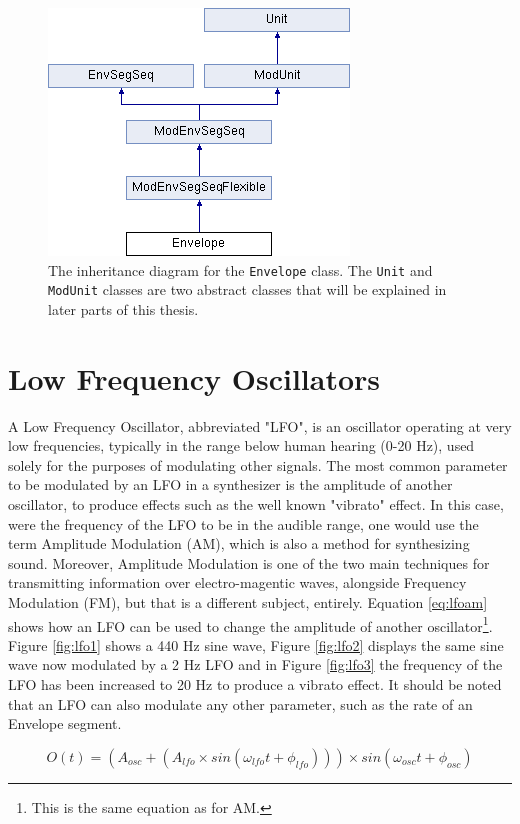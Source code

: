 \documentclass[12pt,twoside]{report}
\begin{document}
\begin{figure}
  \includegraphics[scale=0.7]{img/envelope-inherit}
  \caption{The inheritance diagram for the \texttt{Envelope} class. The \texttt{Unit} and \texttt{ModUnit} classes are two abstract classes that will be explained in later parts of this thesis.}
  \label{fig:envelope-inherit}
\end{figure}

\section{Low Frequency Oscillators}

A Low Frequency Oscillator, abbreviated "LFO", is an oscillator operating at very low frequencies, typically in the range below human hearing (0-20 Hz), used solely for the purposes of modulating other signals. The most common parameter to be modulated by an LFO in a synthesizer is the amplitude of another oscillator, to produce effects such as the well known "vibrato" effect. In this case, were the frequency of the LFO to be in the audible range, one would use the term Amplitude Modulation (AM), which is also a method for synthesizing sound. Moreover, Amplitude Modulation is one of the two main techniques for transmitting information over electro-magentic waves, alongside Frequency Modulation (FM), but that is a different subject, entirely. Equation \ref{eq:lfoam} shows how an LFO can be used to change the amplitude of another oscillator\footnote{This is the same equation as for AM.}. Figure \ref{fig:lfo1} shows a 440 Hz sine wave, Figure \ref{fig:lfo2} displays the same sine wave now modulated by a 2 Hz LFO and in Figure \ref{fig:lfo3} the frequency of the LFO has been increased to 20 Hz to produce a vibrato effect. It should be noted that an LFO can also modulate any other parameter, such as the rate of an Envelope segment.

\begin{equation}
  O(t) = (A_{osc} + (A_{lfo} \times sin(\omega_{lfo}t + \phi_{lfo}))) \times sin(\omega_{osc}t + \phi_{osc})
  \label{eq:lfoam}
\end{equation}
\end{document}

